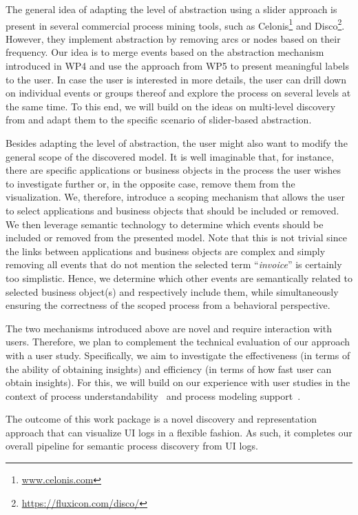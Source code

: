 The general idea of adapting the level of abstraction using a slider approach is present in several commercial process mining tools, such as Celonis\footnote{\url{www.celonis.com}} and Disco\footnote{\url{https://fluxicon.com/disco/}}. However, they implement abstraction by removing arcs or nodes based on their frequency. Our idea is to merge events based on the abstraction mechanism introduced in WP4 and use the approach from WP5 to present meaningful labels to the user. In case the user is interested in more details, the user can drill down on individual events or groups thereof and explore the process on several levels at the same time. To this end, we will build on the ideas on multi-level discovery from \cite{leemans2020using} and adapt them to the specific scenario of slider-based abstraction. 

 Besides adapting the level of abstraction, the user might also want to modify the general scope of the discovered model. It is well imaginable that, for instance, there are specific applications or business objects in the process the user wishes to investigate further or, in the opposite case, remove them from the visualization. We, therefore, introduce a scoping  mechanism that allows the user to select applications and business objects that should be included or removed. We then leverage semantic technology to determine which events should be included or removed from the presented model. Note that this is not trivial since the links between applications and business objects are complex and simply removing all events that do not mention the selected term ``\textit{invoice}'' is certainly too simplistic. Hence, we determine which other events are semantically related to selected business object(s) and respectively include them, while simultaneously ensuring the correctness of the scoped process from a behavioral perspective.    

 The two mechanisms introduced above are novel and require interaction with users. Therefore, we plan to complement the technical evaluation of our approach with a user study. Specifically, we aim to investigate the effectiveness (in terms of the ability of obtaining insights) and efficiency (in terms of how fast user can obtain insights).  For this, we will build on our experience with user studies in the context of process understandability~\cite{pittke2015automatic} and process modeling support~\cite{van2020say}.

 The outcome of this work package is a novel discovery and representation approach that can visualize UI logs in a flexible fashion. As such, it completes our overall pipeline for semantic process discovery from UI logs.  



